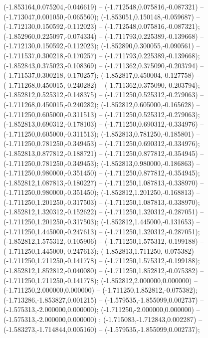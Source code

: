  (-1.853164,0.075204,-0.046619) -- (-1.712548,0.075816,-0.087321) -- (-1.713047,0.001050,-0.065560);
 (-1.853051,0.150148,-0.059687) -- (-1.712130,0.150592,-0.112023) -- (-1.712548,0.075816,-0.087321);
 (-1.852960,0.225097,-0.074334) -- (-1.711793,0.225389,-0.139668) -- (-1.712130,0.150592,-0.112023);
 (-1.852890,0.300055,-0.090561) -- (-1.711537,0.300218,-0.170257) -- (-1.711793,0.225389,-0.139668);
 (-1.852843,0.375023,-0.108369) -- (-1.711362,0.375090,-0.203794) -- (-1.711537,0.300218,-0.170257);
 (-1.852817,0.450004,-0.127758) -- (-1.711268,0.450015,-0.240282) -- (-1.711362,0.375090,-0.203794);
 (-1.852812,0.525312,-0.148375) -- (-1.711250,0.525312,-0.279063) -- (-1.711268,0.450015,-0.240282);
 (-1.852812,0.605000,-0.165628) -- (-1.711250,0.605000,-0.311513) -- (-1.711250,0.525312,-0.279063);
 (-1.852813,0.690312,-0.178103) -- (-1.711250,0.690312,-0.334976) -- (-1.711250,0.605000,-0.311513);
 (-1.852813,0.781250,-0.185801) -- (-1.711250,0.781250,-0.349453) -- (-1.711250,0.690312,-0.334976);
 (-1.852813,0.877812,-0.188721) -- (-1.711250,0.877812,-0.354945) -- (-1.711250,0.781250,-0.349453);
 (-1.852813,0.980000,-0.186863) -- (-1.711250,0.980000,-0.351450) -- (-1.711250,0.877812,-0.354945);
 (-1.852812,1.087813,-0.180227) -- (-1.711250,1.087813,-0.338970) -- (-1.711250,0.980000,-0.351450);
 (-1.852812,1.201250,-0.168813) -- (-1.711250,1.201250,-0.317503) -- (-1.711250,1.087813,-0.338970);
 (-1.852812,1.320312,-0.152622) -- (-1.711250,1.320312,-0.287051) -- (-1.711250,1.201250,-0.317503);
 (-1.852812,1.445000,-0.131653) -- (-1.711250,1.445000,-0.247613) -- (-1.711250,1.320312,-0.287051);
 (-1.852812,1.575312,-0.105906) -- (-1.711250,1.575312,-0.199188) -- (-1.711250,1.445000,-0.247613);
 (-1.852813,1.711250,-0.075382) -- (-1.711250,1.711250,-0.141778) -- (-1.711250,1.575312,-0.199188);
 (-1.852812,1.852812,-0.040080) -- (-1.711250,1.852812,-0.075382) -- (-1.711250,1.711250,-0.141778);
 (-1.852812,2.000000,0.000000) -- (-1.711250,2.000000,0.000000) -- (-1.711250,1.852812,-0.075382);
 (-1.713286,-1.853827,0.001215) -- (-1.579535,-1.855099,0.002737) -- (-1.575313,-2.000000,0.000000);
 (-1.711250,-2.000000,0.000000) -- (-1.575313,-2.000000,0.000000) ;
 (-1.715083,-1.712843,0.002287) -- (-1.583273,-1.714844,0.005160) -- (-1.579535,-1.855099,0.002737);
